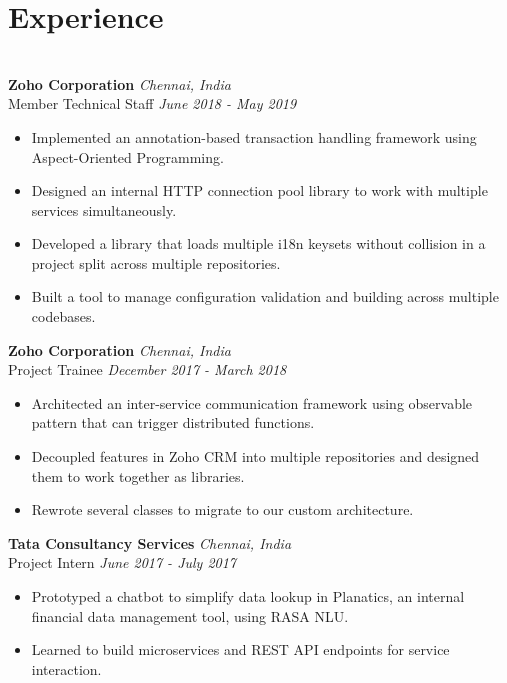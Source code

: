 \documentclass{resume}
\begin{document}
\section*{Experience}
\titlerule
\noindent
\\
\textbf{Zoho Corporation} \hfill \textit{Chennai, India} \\
{\small Member Technical Staff} \hfill \textit{\small June 2018 - May 2019}
\begin{itemize}
  \item Implemented an annotation-based transaction handling framework using Aspect-Oriented Programming.
  \item Designed an internal HTTP connection pool library to work with multiple services simultaneously.
  \item Developed a library that loads multiple i18n keysets without collision in a project split across multiple repositories.
  \item Built a tool to manage configuration validation and building across multiple codebases.
\end{itemize}
\textbf{Zoho Corporation} \hfill \textit{Chennai, India} \\
{\small Project Trainee} \hfill \textit{\small December 2017 - March 2018}
\begin{itemize}
  \item Architected an inter-service communication framework using observable pattern that can trigger distributed functions.
  \item Decoupled features in Zoho CRM into multiple repositories and designed them to work together as libraries.
  \item Rewrote several classes to migrate to our custom architecture.
\end{itemize}
\textbf{Tata Consultancy Services} \hfill \textit{Chennai, India} \\
{\small Project Intern} \hfill \textit{\small June 2017 - July 2017}
\begin{itemize}
  \item Prototyped a chatbot to simplify data lookup in Planatics, an internal financial data management tool, using RASA NLU.
  \item Learned to build microservices and REST API endpoints for service interaction.
\end{itemize}
\end{document}
